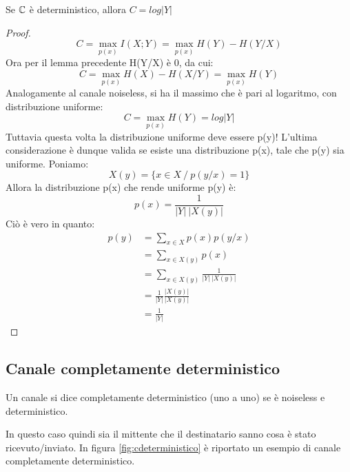 \begin{lemma}
Se $\mathbb{C}$ è deterministico, allora $C=log|Y|$
\begin{proof}
 \[
  C=\max_{p(x)} I(X;Y)=\max_{p(x)} H(Y)-H(Y/X)
 \]
 Ora per il lemma precedente H(Y/X) è 0, da cui:
 \[
  C=\max_{p(x)} H(X)-H(X/Y)=\max_{p(x)} H(Y)
 \]
 Analogamente al canale noiseless, si ha il massimo che è pari al logaritmo, con distribuzione uniforme:
 \[
  C=\max_{p(x)} H(Y)=log|Y|
 \]
 Tuttavia questa volta la distribuzione uniforme deve essere p(y)!
 L'ultima considerazione è dunque valida se esiste una distribuzione p(x), tale che p(y) sia uniforme.
 Poniamo:
 \[
  X(y)=\{x \in X \ / \ p(y/x)=1 \}
 \]
 Allora la distribuzione p(x) che rende uniforme p(y) è:
 \[
  p(x)=\frac{1}{|Y| \ |X(y)|}
 \]
 Ciò è vero in quanto:
 \[\begin{split}
  p(y)&=\sum_{x \in X}p(x)p(y/x) \\
      &=\sum_{x \in X(y)}p(x) \\
      &=\sum_{x \in X(y)}\frac{1}{|Y| \ |X(y)|} \\
      &=\frac{1}{|Y|} \frac{|X(y)|}{|X(y)|} \\
      &=\frac{1}{|Y|}
   \end{split}
 \]

\end{proof}
\end{lemma}


\subsection{Canale completamente deterministico}

\medskip

\begin{definizione}
 Un canale si dice completamente deterministico (uno a uno) se è noiseless e deterministico.
\end{definizione}

In questo caso quindi sia il mittente che il destinatario sanno cosa è stato ricevuto/inviato.
In figura \ref{fig:cdeterministico} è riportato un esempio di canale completamente deterministico.

